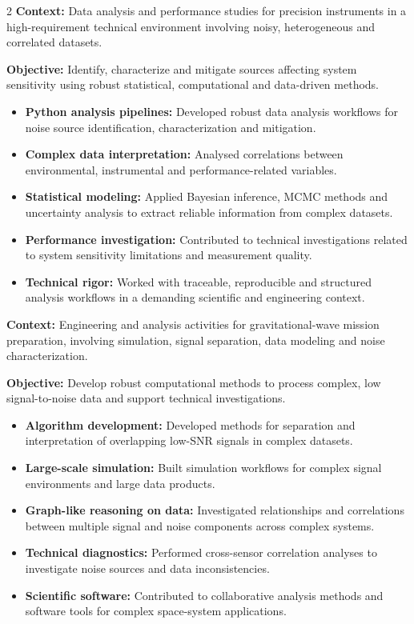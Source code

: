 \documentclass[8pt,a4paper,ragged2e,withhyper]{altacv}
\begin{document}
\begin{paracol}{2}
\textbf{Context:} Data analysis and performance studies for precision instruments in a high-requirement technical environment involving noisy, heterogeneous and correlated datasets.

\textbf{Objective:} Identify, characterize and mitigate sources affecting system sensitivity using robust statistical, computational and data-driven methods.

\begin{itemize}
\item \textbf{Python analysis pipelines:} Developed robust data analysis workflows for noise source identification, characterization and mitigation.
\item \textbf{Complex data interpretation:} Analysed correlations between environmental, instrumental and performance-related variables.
\item \textbf{Statistical modeling:} Applied Bayesian inference, MCMC methods and uncertainty analysis to extract reliable information from complex datasets.
\item \textbf{Performance investigation:} Contributed to technical investigations related to system sensitivity limitations and measurement quality.
\item \textbf{Technical rigor:} Worked with traceable, reproducible and structured analysis workflows in a demanding scientific and engineering context.
\end{itemize}

\divider


\textbf{Context:} Engineering and analysis activities for gravitational-wave mission preparation, involving simulation, signal separation, data modeling and noise characterization.

\textbf{Objective:} Develop robust computational methods to process complex, low signal-to-noise data and support technical investigations.

\begin{itemize}
\item \textbf{Algorithm development:} Developed methods for separation and interpretation of overlapping low-SNR signals in complex datasets.
\item \textbf{Large-scale simulation:} Built simulation workflows for complex signal environments and large data products.
\item \textbf{Graph-like reasoning on data:} Investigated relationships and correlations between multiple signal and noise components across complex systems.
\item \textbf{Technical diagnostics:} Performed cross-sensor correlation analyses to investigate noise sources and data inconsistencies.
\item \textbf{Scientific software:} Contributed to collaborative analysis methods and software tools for complex space-system applications.
\end{itemize}


\end{paracol}
\end{document}
